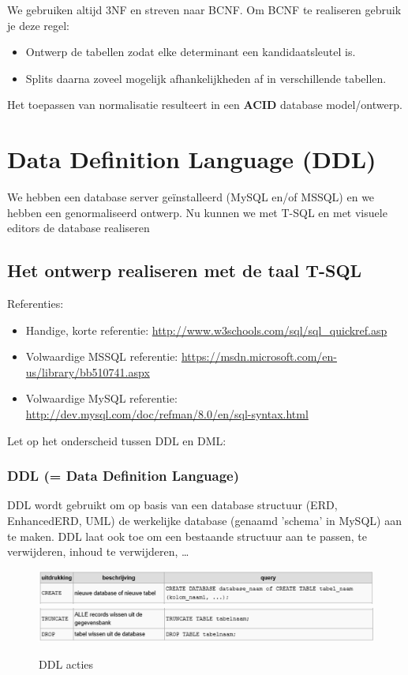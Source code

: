 \documentclass{article}
\newcommand{\bold}[1]{\textbf{#1}}
\begin{document}
We gebruiken altijd 3NF en streven naar BCNF. Om BCNF te realiseren gebruik je deze regel:

\begin{itemize}
    \item Ontwerp de tabellen zodat elke determinant een kandidaatsleutel is. 
    \item Splits daarna zoveel mogelijk afhankelijkheden af in verschillende tabellen.
\end{itemize}

Het toepassen van normalisatie resulteert in een \bold{ACID} database model/ontwerp.

\section{Data Definition Language (DDL)}
We hebben een database server geïnstalleerd (MySQL en/of MSSQL) en 
we hebben een genormaliseerd ontwerp. Nu kunnen we met T-SQL en met visuele editors de database realiseren 

\subsection{Het ontwerp realiseren met de taal T-SQL}
Referenties: 

\begin{itemize}
    \item Handige, korte referentie: \url{http://www.w3schools.com/sql/sql_quickref.asp}
    \item Volwaardige MSSQL referentie: \url{https://msdn.microsoft.com/en-us/library/bb510741.aspx}
    \item Volwaardige MySQL referentie: \url{http://dev.mysql.com/doc/refman/8.0/en/sql-syntax.html}
\end{itemize}

Let op het onderscheid tussen DDL en DML:

\subsubsection{DDL (= Data Definition Language)}
DDL wordt gebruikt om op basis van een database structuur (ERD, EnhancedERD, UML) de werkelijke
database (genaamd 'schema' in MySQL) aan te maken. DDL laat ook toe om een bestaande
structuur aan te passen, te verwijderen, inhoud te verwijderen, \dots

\begin{figure}[H]
    \centering
    \includegraphics[width=\textwidth]{ddl-acties.png}
    \includegraphics[width=\textwidth]{ddl-acties2.png}
    \caption{DDL acties}
\end{figure}
\end{document}
